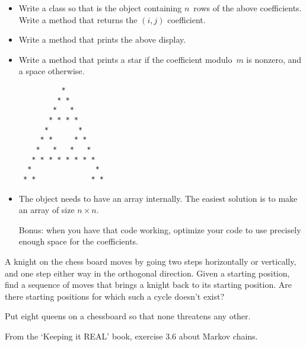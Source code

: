 \begin{exercise}
  \label{ex:pascal-ex}
  \small
  \begin{itemize}
  \item 
    Write a class  so that  is the object
    containing $n$~rows of the above coefficients. Write a method
     that returns the $(i,j)$ coefficient.
  \item
    Write a method  that prints the above display.
  \item
    Write a method  that prints a star if the
    coefficient modulo~$m$ is nonzero, and a space otherwise.
\begin{verbatim}
          *
         * *
        *   *
       * * * *
      *       *
     * *     * *
    *   *   *   *
   * * * * * * * *
  *               *
 * *             * *
\end{verbatim}
  \item
    The object needs to have an array internally. The easiest solution
    is to make an array of size $n\times n$.

    Bonus: when you have that code working, optimize your code to use
    precisely enough space for the coefficients.
  \end{itemize}
\end{exercise}

\begin{exercise}
  A knight on the chess board moves by going two steps horizontally or
  vertically, and one step either way in the orthogonal
  direction. Given a starting position, find a sequence of moves that
  brings a knight back to its starting position. Are there starting
  positions for which such a cycle doesn't exist?
\end{exercise}

\begin{exercise}
  Put eight queens on a chessboard so that none threatens any other.
\end{exercise}

\begin{exercise}
  From the `Keeping it REAL' book, exercise 3.6 about Markov chains.
\end{exercise}
